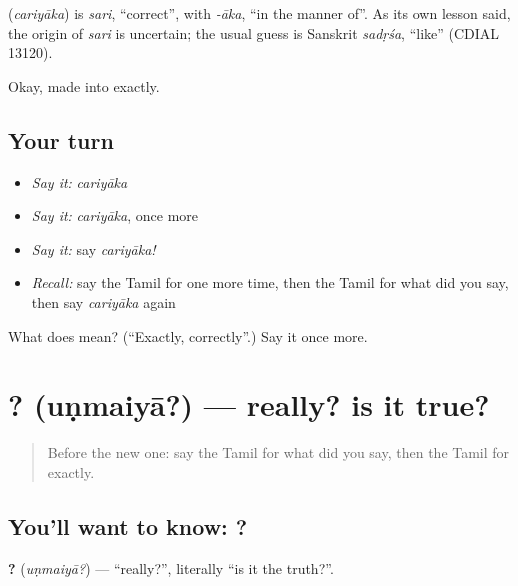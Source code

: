 \begin{cousinweb}
\textbf{} (\emph{cariyāka}) is \emph{sari}, \textquotedblleft{}correct\textquotedblright{}, with \emph{-āka}, \textquotedblleft{}in the manner of\textquotedblright{}. As its own lesson said, the origin of \emph{sari} is uncertain; the usual guess is Sanskrit \emph{sadṛśa}, \textquotedblleft{}like\textquotedblright{} (CDIAL 13120).
\end{cousinweb}

\begin{grammarlens}[title={What you've built}]
Okay, made into exactly.
\end{grammarlens}

\subsection*{Your turn}
\begin{itemize}
\raggedright
  \item \emph{Say it:} \emph{cariyāka}
  \item \emph{Say it:} \emph{cariyāka}, once more
  \item \emph{Say it:} say \emph{cariyāka!}
  \item \emph{Recall:} say the Tamil for one more time, then the Tamil for what did you say, then say \emph{cariyāka} again
\end{itemize}

\begin{tcolorbox}[breakable,colback=teal!4,colframe=teal!35!black,title={Before you move on}]
What does  mean? (\textquotedblleft{}Exactly, correctly\textquotedblright{}.) Say it once more.
\end{tcolorbox}
\section[\texorpdfstring{\ta{உண்மையா}? (uṇmaiyā?)}{உண்மையா? (uṇmaiyā?)}]{? (uṇmaiyā?) — really? is it true?}

\label{lesson:TA-C95-really}



\begin{quote}
Before the new one: say the Tamil for what did you say, then the Tamil for exactly.
\end{quote}

\subsection*{You'll want to know: ?}
\textbf{?} (\emph{uṇmaiyā?}) — \textquotedblleft{}really?\textquotedblright{}, literally \textquotedblleft{}is it the truth?\textquotedblright{}.

